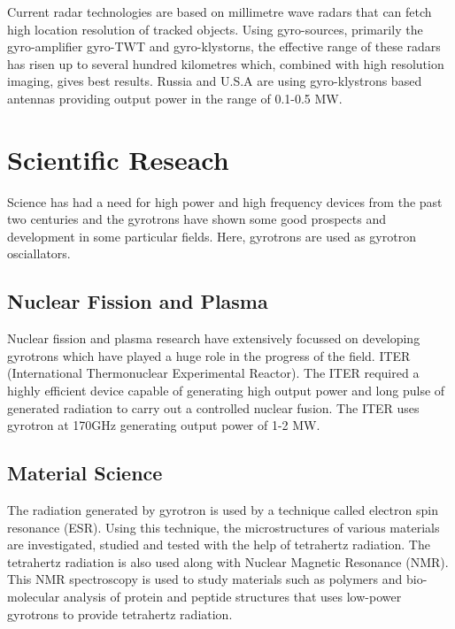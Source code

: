 Current radar technologies are based on millimetre wave radars that can fetch high location resolution of tracked objects. Using gyro-sources, primarily the gyro-amplifier gyro-TWT and gyro-klystorns, the effective range of these radars has risen up to several hundred kilometres which, combined with high resolution imaging, gives best results. Russia and U.S.A are using gyro-klystrons based antennas providing output power in the range of 0.1-0.5 MW.

\section{Scientific Reseach}

Science has had a need for high power and high frequency devices from the past two centuries and the gyrotrons have shown some good prospects and development in some particular fields. Here, gyrotrons are used as gyrotron osciallators.

\subsection{Nuclear Fission and Plasma}
Nuclear fission and plasma research have extensively focussed on developing gyrotrons which have played a huge role in the progress of the field. ITER (International Thermonuclear Experimental Reactor). The ITER required a highly efficient device capable of generating high output power and long pulse of generated radiation to carry out a controlled nuclear fusion. The ITER uses gyrotron at 170GHz generating output power of 1-2 MW.

\subsection{Material Science}
The radiation generated by gyrotron is used by a technique called electron spin resonance (ESR). Using this technique, the microstructures of various materials are investigated, studied and tested with the help of tetrahertz radiation. The tetrahertz radiation is also used along with Nuclear Magnetic Resonance (NMR). This NMR spectroscopy is used to study materials such as polymers and bio-molecular analysis of protein and peptide structures that uses low-power gyrotrons to provide tetrahertz radiation.


